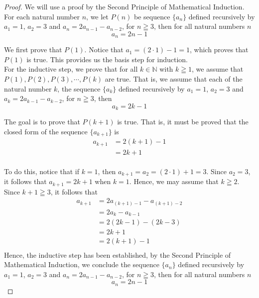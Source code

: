 \documentclass{book}
\theoremstyle{definition}
\begin{document}
\begin{proof}
        We will use a proof by the Second Principle of Mathematical Induction. For each natural number $n$, we let $P(n)$ be sequence $\{a_n \}$ defined recursively by $a_1 = 1$, $a_2 = 3$ and $a_n = 2a_{n-1} - a_{n-2}$, for $n \geqq 3$, then for all natural numbers $n$
            \begin{equation*}
                a_n = 2n - 1
            \end{equation*}
        
        We first prove that $P(1)$. Notice that $a_1 = (2 \cdot 1) - 1 = 1$, which proves that $P(1)$ is true. This provides us the basis step for induction. \\ 
        
        For the inductive step, we prove that for all $k \in \mathbb{N}$ with $k \geqq 1$, we assume that $P(1), P(2), P(3), \cdots, P(k)$ are true. That is, we assume that each of the natural number $k$, the sequence $\{ a_k \}$ defined recursively by $a_1 = 1$, $a_2 = 3$ and $a_k = 2a_{k-1} - a_{k-2}$, for $n \geqq 3$, then
            \begin{equation*}
                a_k = 2k - 1
            \end{equation*}        
        
        The goal is to prove that $P(k+1)$ is true. That is, it must be proved that the closed form of the sequence $\{ a_{k+1} \}$ is  
            \begin{align*}
                a_{k+1} & = 2(k+1) - 1 \\
                & = 2k + 1 \\
            \end{align*} 
        
        To do this, notice that if $k=1$, then $a_{k+1} = a_2 = (2 \cdot 1) + 1 = 3$. Since $a_2 = 3$, it follows that $a_{k+1} = 2k + 1$ when $k=1$. Hence, we may assume that $k \geqq 2$. Since $k+1 \geqq 3$, it follows that 
            \begin{align*}
                a_{k+1} & = 2a_{(k+1) - 1} - a_{(k+1) - 2} \\
                    & = 2a_k - a_{k-1} \\
                    & = 2(2k - 1) - (2k - 3) \\ 
                    & = 2k + 1 \\
                    & = 2(k+1) - 1 \\
            \end{align*}
        Hence, the inductive step has been established, by the Second Principle of Mathematical Induction, we conclude the sequence $\{a_n \}$ defined recursively by $a_1 = 1$, $a_2 = 3$ and $a_n = 2a_{n-1} - a_{n-2}$, for $n \geqq 3$, then for all natural numbers $n$
            \begin{equation*}
                a_n = 2n - 1
            \end{equation*}
\end{proof}
\end{document}
